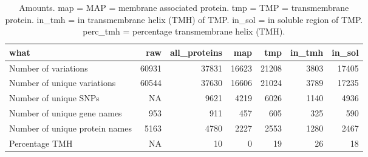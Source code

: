 \begin{table}

\caption{\label{tab:ncbi_counts}Amounts. map = MAP = membrane associated protein. tmp = TMP = transmembrane protein. in\_tmh = in transmembrane helix (TMH) of TMP. in\_sol = in soluble region of TMP. perc\_tmh = percentage transmembrane helix (TMH). }
\centering
\begin{tabular}[t]{l|r|r|r|r|r|r}
\hline
what & raw & all\_proteins & map & tmp & in\_tmh & in\_sol\\
\hline
Number of variations & 60931 & 37831 & 16623 & 21208 & 3803 & 17405\\
\hline
Number of unique variations & 60544 & 37630 & 16606 & 21024 & 3789 & 17235\\
\hline
Number of unique SNPs & NA & 9621 & 4219 & 6026 & 1140 & 4936\\
\hline
Number of unique gene names & 953 & 911 & 457 & 605 & 325 & 590\\
\hline
Number of unique protein names & 5163 & 4780 & 2227 & 2553 & 1280 & 2467\\
\hline
Percentage TMH & NA & 10 & 0 & 19 & 26 & 18\\
\hline
\end{tabular}
\end{table}